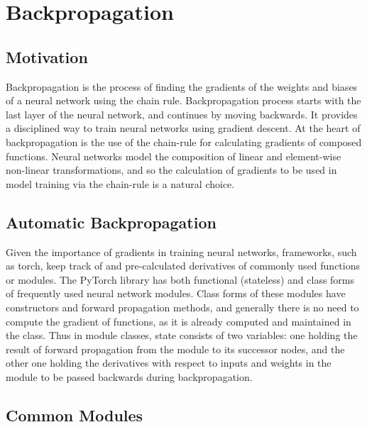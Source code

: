 
\chapter{Backpropagation}\label{chp:Backpropagation}

\section{Motivation}

Backpropagation is the process of finding the gradients of the weights and biases of a neural network using the chain rule. Backpropagation process starts with the last layer of the neural network, and continues by moving backwards.
It provides a disciplined way to train neural networks using gradient descent.
At the heart of backpropagation is the use of the chain-rule for calculating gradients of composed functions.
Neural networks model the composition of linear and element-wise non-linear transformations, and so the calculation of gradients to be used in model training via the chain-rule is a natural choice.

\section{Automatic Backpropagation}

Given the importance of gradients in training neural networks, frameworks, such as torch, keep track of and pre-calculated derivatives of commonly used functions or modules.
The PyTorch library has both functional (stateless) and class forms of frequently used neural network modules.
Class forms of these modules have constructors and forward propagation methods, and generally there is no need to compute the gradient of functions, as it is already computed and maintained in the class.
Thus in module classes, state consists of two variables: one holding the result of forward propagation from the module to its successor nodes, and the other one holding the derivatives with respect to inputs and weights in the module to be passed backwards during backpropagation.

\section{Common Modules}

